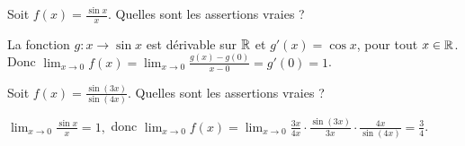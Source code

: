 \begin{question}
 
Soit $f(x)= \frac{\sin x}{x}$. Quelles sont les assertions vraies ?
\begin{answers}

    
    
    
    
  
\end{answers}
\begin{explanations}
La fonction $g: x\to \sin x$ est dérivable sur $\mathbb{R}$  et $g'(x)= \cos x$, pour tout $x\in \mathbb{R}$. Donc  $\lim_{x\to 0}f(x)= \lim_{x\to 0}\frac{g(x)-g(0)}{x-0} = g'(0)=1$.
\end{explanations}

\end{question}



\begin{question}

Soit $f(x)= \frac{\sin(3x)}{\sin(4x)}$. Quelles sont les assertions vraies ?
\begin{answers}

    
    
    
    

 
\end{answers}
\begin{explanations}
$\lim_{x\to 0}\frac{\sin x}{x} = 1,$ donc $\lim_{x\to 0} f(x)= \lim_{x\to 0}\frac{3x}{4x} \cdot  \frac{\sin (3x)}{3x}\cdot  \frac{4x}{\sin(4x)} = \frac{3}{4}$.
\end{explanations}

\end{question}



